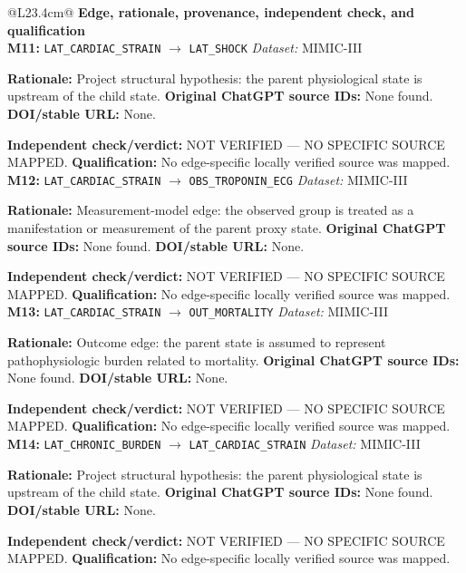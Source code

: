 \begin{tabular}{@{}L{23.4cm}@{}}
\toprule
\textbf{Edge, rationale, provenance, independent check, and qualification}\\
\midrule
\textbf{M11:} \nolinkurl{LAT_CARDIAC_STRAIN} $\rightarrow$ \nolinkurl{LAT_SHOCK} \hfill \textit{Dataset:} MIMIC-III\par\textbf{Rationale:} Project structural hypothesis: the parent physiological state is upstream of the child state. \textbf{Original ChatGPT source IDs:} None found. \textbf{DOI/stable URL:} None.\par\textbf{Independent check/verdict:} NOT VERIFIED --- NO SPECIFIC SOURCE MAPPED. \textbf{Qualification:} No edge-specific locally verified source was mapped. \\
\addlinespace[2pt]
\midrule
\textbf{M12:} \nolinkurl{LAT_CARDIAC_STRAIN} $\rightarrow$ \nolinkurl{OBS_TROPONIN_ECG} \hfill \textit{Dataset:} MIMIC-III\par\textbf{Rationale:} Measurement-model edge: the observed group is treated as a manifestation or measurement of the parent proxy state. \textbf{Original ChatGPT source IDs:} None found. \textbf{DOI/stable URL:} None.\par\textbf{Independent check/verdict:} NOT VERIFIED --- NO SPECIFIC SOURCE MAPPED. \textbf{Qualification:} No edge-specific locally verified source was mapped. \\
\addlinespace[2pt]
\midrule
\textbf{M13:} \nolinkurl{LAT_CARDIAC_STRAIN} $\rightarrow$ \nolinkurl{OUT_MORTALITY} \hfill \textit{Dataset:} MIMIC-III\par\textbf{Rationale:} Outcome edge: the parent state is assumed to represent pathophysiologic burden related to mortality. \textbf{Original ChatGPT source IDs:} None found. \textbf{DOI/stable URL:} None.\par\textbf{Independent check/verdict:} NOT VERIFIED --- NO SPECIFIC SOURCE MAPPED. \textbf{Qualification:} No edge-specific locally verified source was mapped. \\
\addlinespace[2pt]
\midrule
\textbf{M14:} \nolinkurl{LAT_CHRONIC_BURDEN} $\rightarrow$ \nolinkurl{LAT_CARDIAC_STRAIN} \hfill \textit{Dataset:} MIMIC-III\par\textbf{Rationale:} Project structural hypothesis: the parent physiological state is upstream of the child state. \textbf{Original ChatGPT source IDs:} None found. \textbf{DOI/stable URL:} None.\par\textbf{Independent check/verdict:} NOT VERIFIED --- NO SPECIFIC SOURCE MAPPED. \textbf{Qualification:} No edge-specific locally verified source was mapped. \\

\end{tabular}
